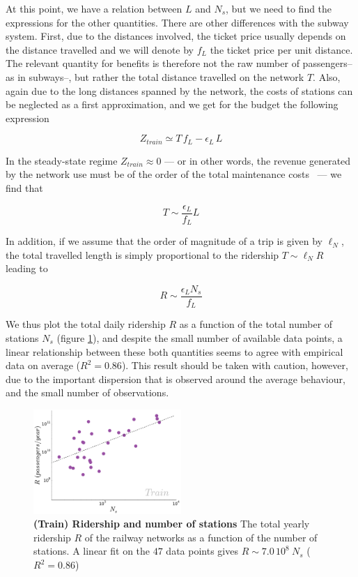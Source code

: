 At this point, we have a relation between $L$ and $N_s$, but we need to find the
expressions for the other quantities. There are other differences with the
subway system. First, due to the distances involved, the ticket price usually
depends on the distance travelled and we will denote by $f_L$ the ticket price
per unit distance. The relevant quantity for benefits is therefore not the raw
number of passengers--as in subways--, but rather the total distance travelled
on the network $T$. Also, again due to the long distances spanned by the
network, the costs of stations can be neglected as a first approximation, and we
get for the budget the following expression

\begin{equation}
    Z_{train} \simeq T\, f_L - \epsilon_L\, L
\end{equation}

In the steady-state regime $Z_{train}\approx 0$ --- or in other words, the
revenue generated by the network use must be of the order of the total
maintenance costs~\cite{Louf:2013_emergence} --- we find that

\begin{equation}
    T \sim \frac{\epsilon_L}{f_L} L
\end{equation}

In addition, if we assume that the order of magnitude of a trip is given by
$\ell_N$, the total travelled length is simply proportional to the ridership
$T\sim \ell_N R$ leading to 

\begin{equation}
    R \sim \frac{\epsilon_LN_s}{f_L}
\end{equation}

We thus plot the total daily ridership $R$ as a function of the total number of
stations $N_s$ (figure \ref{fig:train_rider}), and despite the small number of
available data points, a linear relationship between these both quantities seems
to agree with empirical data on average ($R^2 = 0.86$). This result should be
taken with caution, however, due to the important dispersion that is observed
around the average behaviour, and the small number of observations.

\begin{figure}
    \centering
    \includegraphics[width=0.5\textwidth]{gfx/chapter-networks/rail_ridership_stations.pdf}
    \caption{{\bf(Train) Ridership and number of stations} The total yearly
    ridership $R$ of the railway networks as a function of the number of
stations. A linear fit on the $47$ data points gives $R \sim 7.0\,10^8\:N_s$
($R^2 = 0.86$)} \label{fig:train_rider} 
\end{figure}

